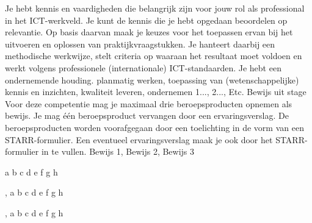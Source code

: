 
\competentie
{%
	\competentieformulier
	{%
		Je hebt kennis en vaardigheden die belangrijk zijn voor jouw rol als professional in het ICT-werkveld. Je kunt de kennis die je hebt opgedaan beoordelen op relevantie. Op basis daarvan maak je keuzes voor het toepassen ervan bij het uitvoeren en oplossen van praktijkvraagstukken. Je hanteert daarbij een methodische werkwijze, stelt criteria op waaraan het resultaat moet voldoen en werkt volgens professionele (internationale) ICT-standaarden. Je hebt een ondernemende houding.
	}
	{%
		planmatig werken,%
		toepassing van (wetenschappelijke) kennis en inzichten,%
		kwaliteit leveren,%
		ondernemen%
	}
	{%
		1...,%
		2...,%
		Etc.%
	}
	{%
		Bewijs uit stage
	}
	{%
		Voor deze competentie mag je maximaal drie beroepsproducten opnemen als bewijs. Je mag één beroepsproduct vervangen door een ervaringsverslag. De beroepsproducten worden voorafgegaan door een toelichting in de vorm van een STARR-formulier. Een eventueel ervaringsverslag maak je ook door het STARR-formulier in te vullen.
	}
	{%
		Bewijs 1,%
		Bewijs 2,%
		Bewijs 3%
	}
}
{%
	\bewijs
	{%
		a
	}
	{%
		\starr
		{%
			b
		}
		{%
			c
		}
		{%
			d
		}
		{%
			e
		}
		{%
			f
		}
		{%
			g
		}
		{%
			h
		}
	}
	{%
		
	},
	\bewijs
	{%
		a
	}
	{%
		\starr
		{%
			b
		}
		{%
			c
		}
		{%
			d
		}
		{%
			e
		}
		{%
			f
		}
		{%
			g
		}
		{%
			h
		}
	}
	{%
		
	},
	\bewijs
	{%
		a
	}
	{%
		\starr
		{%
			b
		}
		{%
			c
		}
		{%
			d
		}
		{%
			e
		}
		{%
			f
		}
		{%
			g
		}
		{%
			h
		}
	}
	{%
		
	}
}
